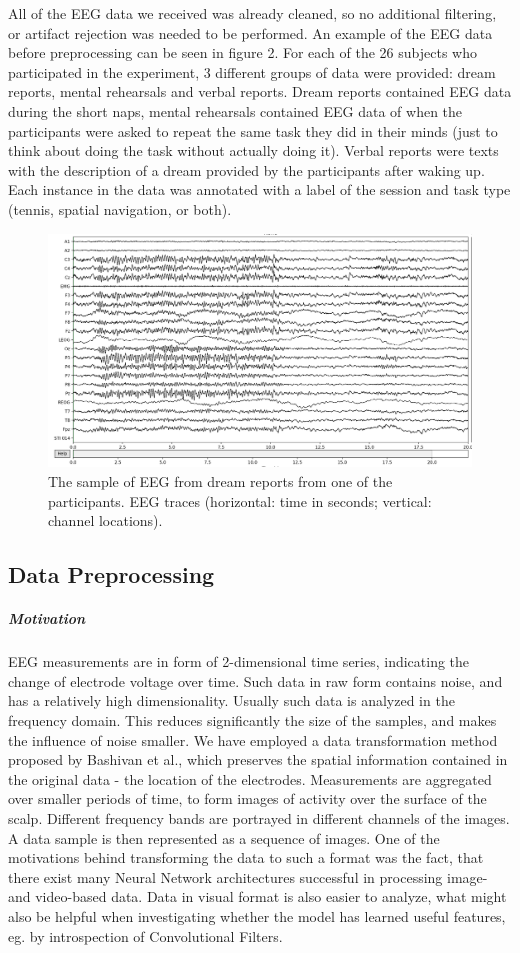 \documentclass{article}
\begin{document}
All of the EEG data we received was already cleaned, so no additional filtering, or artifact rejection was needed to be performed. An example of the EEG data before preprocessing can be seen in figure 2.  For each of the 26 subjects who participated in the experiment, 3 different groups of data were provided: dream reports, mental rehearsals and verbal reports.  Dream reports contained EEG data during the short naps, mental rehearsals contained EEG data of when the participants were asked to repeat the same task they did in their minds (just to think about doing the task without actually doing it). Verbal reports were texts with the description of a dream provided by the participants after waking up. Each instance in the data was annotated with a label of the session and task type (tennis, spatial navigation, or both).
\begin{figure}
	\centering
	\includegraphics[scale=0.2]{eeg_ex}
	\caption{The sample of EEG from dream reports from one of the participants. EEG traces (horizontal: time in seconds; vertical: channel locations).}
\end{figure} 

\subsection{Data Preprocessing}

\subparagraph{Motivation} EEG measurements are in form of 2-dimensional time series, indicating the change of electrode voltage over time. Such data in raw form contains noise, and has a relatively high dimensionality. Usually such data is analyzed in the frequency domain. This reduces significantly the size of the samples, and makes the influence of noise smaller. We have employed a data transformation method proposed by Bashivan et al.\cite{learning_eeg_repr}, which preserves the spatial information contained in the original data - the location of the electrodes. Measurements are aggregated over smaller periods of time, to form images of activity over the surface of the scalp. Different frequency bands are portrayed in different channels of the images. A data sample is then represented as a sequence of images. One of the motivations behind transforming the data to such a format was the fact, that there exist many Neural Network architectures successful in processing image- and video-based data. Data in visual format is also easier to analyze, what might also be helpful when investigating whether the model has learned useful features, eg. by introspection of Convolutional Filters. %
\end{document}
